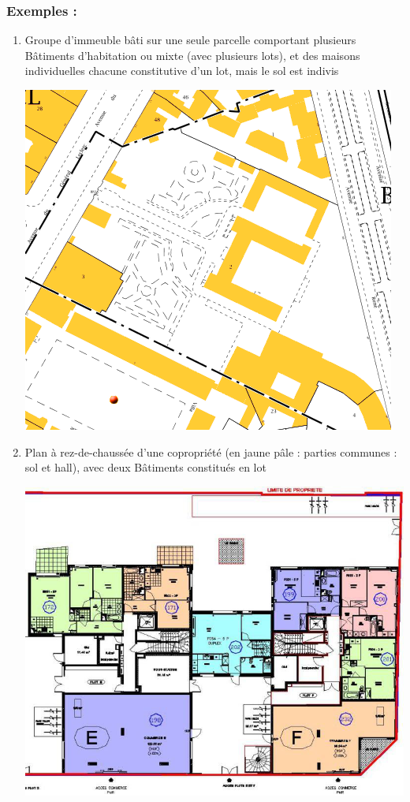 		\subsubsection{Exemples :}
			\begin{enumerate}
				\item Groupe d’immeuble bâti sur une seule parcelle comportant plusieurs Bâtiments d’habitation ou
				mixte (avec plusieurs lots), et des maisons individuelles chacune constitutive d’un lot, mais le sol
				est indivis
				\begin{center}
					\includegraphics[width=0.7\linewidth]{images/assietteCopro}
				\end{center}
				
				\item  Plan à rez-de-chaussée d’une copropriété (en jaune pâle : parties communes :
				sol et hall), avec deux Bâtiments constitués en lot
				\begin{center}
					\includegraphics[width=0.7\linewidth]{images/planRdcCopro}
				\end{center}
				

\end{enumerate}
